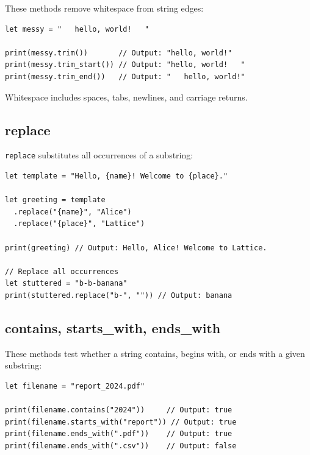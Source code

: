 These methods remove whitespace from string edges:

\begin{lstlisting}[language=Lattice, caption={Trimming whitespace}]
let messy = "   hello, world!   "

print(messy.trim())       // Output: "hello, world!"
print(messy.trim_start()) // Output: "hello, world!   "
print(messy.trim_end())   // Output: "   hello, world!"
\end{lstlisting}

Whitespace includes spaces, tabs, newlines, and carriage returns.

\subsection{replace}\label{sec:replace}

\lstinline|replace| substitutes all occurrences of a substring:

\begin{lstlisting}[language=Lattice, caption={String replacement}]
let template = "Hello, {name}! Welcome to {place}."

let greeting = template
  .replace("{name}", "Alice")
  .replace("{place}", "Lattice")

print(greeting) // Output: Hello, Alice! Welcome to Lattice.

// Replace all occurrences
let stuttered = "b-b-banana"
print(stuttered.replace("b-", "")) // Output: banana
\end{lstlisting}

\subsection{contains, starts\_with, ends\_with}\label{sec:string-search}

These methods test whether a string contains, begins with, or ends with a given substring:

\begin{lstlisting}[language=Lattice, caption={String searching}]
let filename = "report_2024.pdf"

print(filename.contains("2024"))     // Output: true
print(filename.starts_with("report")) // Output: true
print(filename.ends_with(".pdf"))    // Output: true
print(filename.ends_with(".csv"))    // Output: false
\end{lstlisting}

